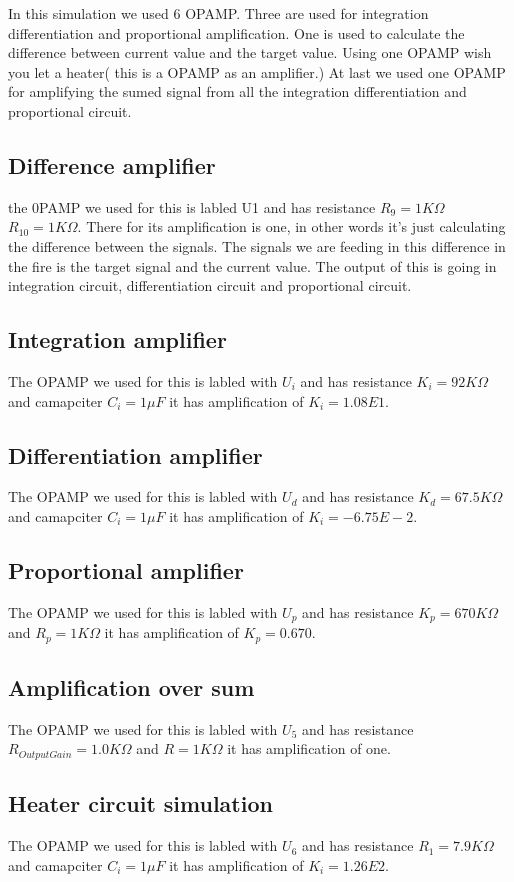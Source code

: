  In this simulation we used 6 OPAMP. Three are used for integration differentiation and proportional amplification. One is used to calculate the difference between current value and the target value. Using one OPAMP wish you let a heater( this is a OPAMP as an amplifier.) At last we used one OPAMP for amplifying the sumed signal from all the integration differentiation and proportional circuit. 


 \subsection{Difference amplifier}
  the 0PAMP we used for this is labled U1 and has resistance $R_9 = 1K\Omega$  $R_10= 1K\Omega$. There for its amplification is one, in other words it's just calculating the difference between the signals. The signals we are feeding in this difference in the fire is the target signal and the current value. The output of this is going in integration circuit, differentiation circuit and proportional circuit.
 \subsection{Integration amplifier }
 The OPAMP we used for this is labled with $U_i$ and has resistance $K_i = 92K\Omega$ and camapciter $C_i = 1\mu F$  it has amplification of $K_i = 1.08E1$.
 \subsection{Differentiation amplifier}
 The OPAMP we used for this is labled with $U_d$ and has resistance $K_d = 67.5K\Omega$ and camapciter $C_i = 1\mu F$  it has amplification of $K_i = - 6.75E-2$.
 \subsection{Proportional amplifier}
 The OPAMP we used for this is labled with $U_p$ and has resistance $K_p = 670K\Omega$ and $R_p = 1K\Omega$  it has amplification of $K_p = 0.670$.
 \subsection{Amplification over sum}
 The OPAMP we used for this is labled with $U_5$ and has resistance $R_{OutputGain} = 1.0K\Omega$ and $R = 1K\Omega$  it has amplification of one.
 \subsection{Heater circuit simulation}
 The OPAMP we used for this is labled with $U_6$ and has resistance $R_1 = 7.9K\Omega$ and camapciter $C_i = 1\mu F$  it has amplification of $K_i = 1.26E2$.



